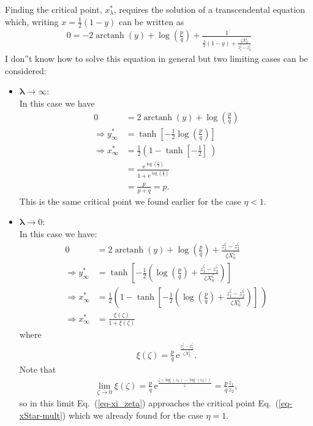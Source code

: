 \documentclass[11pt]{article}
\DeclareMathOperator\arctanh{arctanh}
\begin{document}
Finding the critical point, $x_\lambda^*$, requires the solution of a transcendental equation which, writing $x = \frac{1}{2}(1- y)$ can be written as
\begin{align}
0=-2 \arctanh(y) + \log\left(\frac{p}{q}\right) + \frac{1}{\frac{\lambda}{2} \left(1 - y \right) + \frac{\zeta X_0^\zeta}{z_1^\zeta - z_2^\zeta}} 
\end{align}
I don''t know how to solve this equation in general but two limiting cases can be considered:

\begin{itemize}
\item{$\mathbf \lambda \to \infty$:\\}
In this case we have
\begin{align*}
0 &= 2 \arctanh(y) + \log\left(\frac{p}{q}\right)\\
\Rightarrow y_\infty^* & = \tanh \left[-\frac{1}{2}\log\left(\frac{p}{q}\right) \right]\\
\Rightarrow x_\infty^* & = \frac{1}{2}\left( 1 -  \tanh \left[-\frac{1}{2}\right]\ \right)\\
&= \frac{\mathrm{e}^{\log\left(\frac{p}{q}\right) }}{1 + \mathrm{e}^{\log\left(\frac{p}{q}\right)} }\\
&= \frac{p}{p+q} = p.
\end{align*}
This is the same critical point we found earlier for the case $\eta <1$.
\item{$\mathbf \lambda \to 0$:\\}
In this case we have:
\begin{align}
\nonumber 0 &= 2 \arctanh(y) + \log\left(\frac{p}{q}\right) + \frac{z_1^\zeta - z_2^\zeta}{\zeta X_0^\zeta}\\
\nonumber \Rightarrow y_\infty^* & = \tanh \left[-\frac{1}{2}\left(\log\left(\frac{p}{q}\right) +  \frac{z_1^\zeta - z_2^\zeta}{\zeta X_0^\zeta}\right) \right]\\
\nonumber \Rightarrow x_\infty^* & = \frac{1}{2}\left( 1 -  \tanh \left[-\frac{1}{2}\left( \log\left(\frac{p}{q}\right) +  \frac{z_1^\zeta - z_2^\zeta}{\zeta X_0^\zeta}\right)\right]\ \right)\\
\Rightarrow x_\infty^* &= \frac{\xi(\zeta)}{1 + \xi(\zeta) }
\end{align}
where
\begin{align}
\label{eq-xi_zeta}
\xi(\zeta) = \frac{p}{q}\,\mathrm{e}^{\frac{z_1^\zeta - z_2^\zeta}{\zeta X_0^\zeta}}.
\end{align}
Note that
\begin{align*}
\lim_{\zeta \to 0} \xi(\zeta) =  \frac{p}{q} \,\mathrm{e}^{\frac{\zeta \left( \log(z_1) - \log(z_2)\right)}{\zeta}} =  \frac{p}{q} \frac{z_1}{z_2},
\end{align*}
so in this limit Eq.~(\ref{eq-xi_zeta}) approaches the critical point Eq.~(\ref{eq-xStar-mult}) which we already found for the case $\eta=1$.
\end{itemize}







\end{document}
